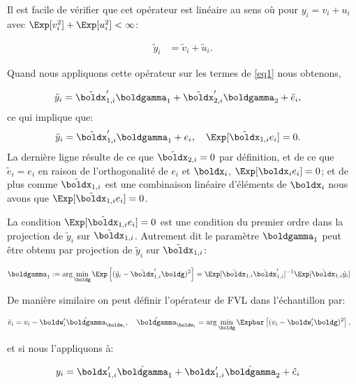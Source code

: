 Il est facile de vérifier que cet opérateur est linéaire au sens où pour $y_i = v_i + u_i$ avec
$\Exp[v_i^2] + \Exp[u_i^2]<\infty$:

\begin{align*}
\tilde{y}_i &= \tilde{v}_i + \tilde{u}_i.
\end{align*}

Quand nous appliquons cette opérateur sur les termes de \eqref{eq1} nous obtenons,

\begin{align*}
\tilde{y}_i &= \tilde{\boldx}_{1, i}^\prime\boldgamma_1 + \tilde{\boldx}_{2, i}^\prime\boldgamma_2 +
\tilde{e}_i,
\end{align*}
ce qui implique que: 
\begin{align}
	\tilde{y}_i &= \tilde{\boldx}_{1, i}^\prime\boldgamma_1 + e_i, \quad \Exp[ \tilde{\boldx}_{1, i} e_i]=0.
	\label{eq2}
\end{align}
La dernière ligne résulte de ce que $\tilde{\boldx}_{2, i} = 0$ par définition, et de ce que $\tilde{e}_i = e_i$ 
en raison de l'orthogonalité de $e_i$ et $\boldx_i$, $\Exp[\boldx_ie_i] = 0$; et de plus comme 
$\tilde{\boldx}_{1, i}$ 
est une combinaison linéaire d'éléments de $\boldx_i$ nous avons que $\Exp[\tilde{\boldx}_{1, i}e_i]=0$.

La condition $\Exp[ \tilde{\boldx}_{1, i} e_i]=0$ est une condition du premier ordre dans la projection de 
$\tilde{y}_i$ sur $\tilde{\boldx}_{1, i}$. Autrement dit le paramètre $\boldgamma_1$ 
peut être obtenu par projection de $\tilde{y}_i$ sur $\tilde{\boldx}_{1, i}$:

\begin{align*}
\boldgamma_1 &:= \arg\min_{\boldg}\Exp\left[(\tilde{y}_i - \tilde{\boldx}_{1, i}^\prime \boldg)^2\right] = 
\Exp[\tilde{\boldx}_{1, i}\tilde{\boldx}_{1, i}^\prime]^{-1}\Exp[\tilde{\boldx}_{1, i}\tilde{y}_i]
\end{align*}

De manière similaire on peut définir l'opérateur de FVL dans l'échantillon par:

\begin{align*}
	\check{v}_i &= v_i -\boldw_i^\prime\hat{\boldgamma}_{\boldw_i}, \quad
	\hat{\boldgamma}_{\boldw_i} = \arg\min_{\boldg}\Expbar\left[(v_i - \boldw_i^\prime \boldg)^2\right],
	\end{align*}

	et si nous l'appliquons à:

	\begin{align*}
y_i &= \boldx_{1, i}^\prime \hat{\boldgamma}_1 + \boldx_{1, i}^\prime \hat{\boldgamma}_2 + \hat{e}_i
	\end{align*}

